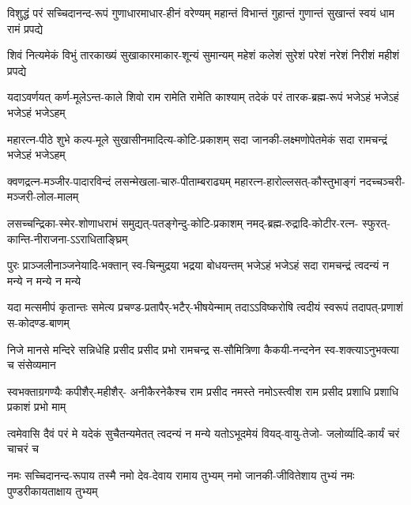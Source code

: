

\fourlineindentedshloka
{विशुद्धं परं सच्चिदानन्द-रूपं}
{गुणाधारमाधार-हीनं वरेण्यम्}
{महान्तं विभान्तं गुहान्तं गुणान्तं}
{सुखान्तं स्वयं धाम रामं प्रपद्ये}%

\fourlineindentedshloka
{शिवं नित्यमेकं विभुं तारकाख्यं}
{सुखाकारमाकार-शून्यं सुमान्यम्}
{महेशं कलेशं सुरेशं परेशं}
{नरेशं निरीशं महीशं प्रपद्ये}%

\fourlineindentedshloka
{यदाऽवर्णयत् कर्ण-मूलेऽन्त-काले}
{शिवो राम रामेति रामेति काश्याम्}
{तदेकं परं तारक-ब्रह्म-रूपं}
{भजेऽहं भजेऽहं भजेऽहं भजेऽहम्}%

\fourlineindentedshloka
{महारत्न-पीठे शुभे कल्प-मूले}
{सुखासीनमादित्य-कोटि-प्रकाशम्}
{सदा जानकी-लक्ष्मणोपेतमेकं}
{सदा रामचन्द्रं भजेऽहं भजेऽहम्}%

\fourlineindentedshloka
{क्वणद्रत्न-मञ्जीर-पादारविन्दं}
{लसन्मेखला-चारु-पीताम्बराढ्यम्}
{महारत्न-हारोल्लसत्-कौस्तुभाङ्गं}
{नदच्चञ्चरी-मञ्जरी-लोल-मालम्}%

\fourlineindentedshloka
{लसच्चन्द्रिका-स्मेर-शोणाधराभं}
{समुद्यत्-पतङ्गेन्दु-कोटि-प्रकाशम्}
{नमद्-ब्रह्म-रुद्रादि-कोटीर-रत्न-}
{स्फुरत्-कान्ति-नीराजना-ऽऽराधिताङ्घ्रिम्}%

\fourlineindentedshloka
{पुरः प्राञ्जलीनाञ्जनेयादि-भक्तान्}
{स्व-चिन्मुद्रया भद्रया बोधयन्तम्}
{भजेऽहं भजेऽहं सदा रामचन्द्रं}
{त्वदन्यं न मन्ये न मन्ये न मन्ये}%

\fourlineindentedshloka
{यदा मत्समीपं कृतान्तः समेत्य}
{प्रचण्ड-प्रतापैर्-भटैर्-भीषयेन्माम्}
{तदाऽऽविष्करोषि त्वदीयं स्वरूपं}
{तदापत्-प्रणाशं स-कोदण्ड-बाणम्}%

\fourlineindentedshloka
{निजे मानसे मन्दिरे सन्निधेहि}
{प्रसीद प्रसीद प्रभो रामचन्द्र}
{स-सौमित्रिणा कैकयी-नन्दनेन}
{स्व-शक्त्याऽनुभक्त्या च संसेव्यमान}%

\fourlineindentedshloka
{स्वभक्ताग्रगण्यैः कपीशैर्-महीशैर्-}
{अनीकैरनेकैश्च राम प्रसीद}
{नमस्ते नमोऽस्त्वीश राम प्रसीद}
{प्रशाधि प्रशाधि प्रकाशं प्रभो माम्}%

\fourlineindentedshloka
{त्वमेवासि दैवं परं मे यदेकं}
{सुचैतन्यमेतत् त्वदन्यं न मन्ये}
{यतोऽभूदमेयं वियद्-वायु-तेजो-}
{जलोर्व्यादि-कार्यं चरं चाचरं च}%

\fourlineindentedshloka
{नमः सच्चिदानन्द-रूपाय तस्मै}
{नमो देव-देवाय रामाय तुभ्यम्}
{नमो जानकी-जीवितेशाय तुभ्यं}
{नमः पुण्डरीकायताक्षाय तुभ्यम्}%

